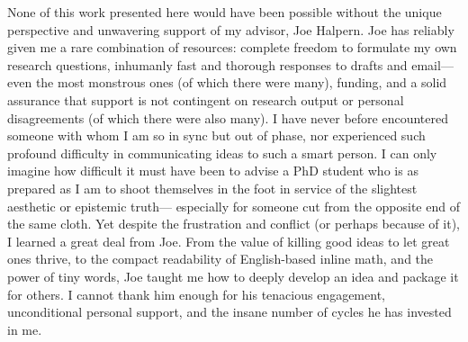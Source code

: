 %
%
None of this work presented here would have been possible without the unique perspective and unwavering support of my advisor, Joe Halpern. 
Joe has reliably given me a rare combination of resources:
complete freedom to formulate my own research questions,
inhumanly fast and thorough responses to drafts and email---even the most monstrous ones (of which there were many),
funding, and a solid assurance that support is not contingent on research output or personal disagreements (of which there were also many).
%
%
I have never before encountered someone with whom I am so in sync but out of phase, 
    nor experienced such profound difficulty in communicating ideas to such a smart person. 
%
I can only imagine how difficult it must have been
    to advise a PhD student
    who is as prepared as I am to shoot themselves in the foot
        in service of the slightest aesthetic or epistemic truth---%
    especially for someone cut from the opposite end of the same cloth.
%
Yet despite the frustration and conflict (or perhaps because of it), I learned a great deal from Joe. 
    From the value of killing good ideas to let great ones thrive, 
        to the compact readability of English-based inline math, 
        and the power of tiny words,
    Joe taught me how to deeply develop an idea and package it for others.
I cannot thank him enough for his tenacious engagement, unconditional personal support, and the insane number of cycles he has invested in me. 

